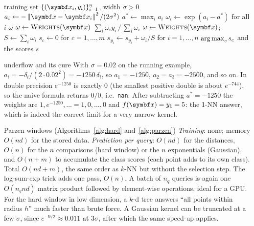 \documentclass[11pt]{article}
\begin{document}
\begin{algorithm}[htbp]
\caption{Gaussian Parzen classifier and Nadaraya--Watson regressor (log-sum-exp form)}
\label{alg:parzen}
\begin{algorithmic}[1]
\Require training set $\{(\x_i, y_i)\}_{i=1}^n$, width $\sigma > 0$
    \State $a_i \gets -\norm{\x - \x_i}^2 / (2\sigma^2)$ 
  \EndFor
  \State $a^* \gets \max_i a_i$
  \State $\omega_i \gets \exp(a_i - a^*)$ for all $i$ 
  \State \Return $\omega$
\EndFunction
{}
  \State $\omega \gets \Call{Weights}{\x}$
  \State \Return $\sum_i \omega_i y_i \,/\, \sum_i \omega_i$
\EndFunction
{}
  \State $\omega \gets \Call{Weights}{\x}$; \ $S \gets \sum_i \omega_i$
  \State $s_c \gets 0$ for $c = 1, \dots, m$
  \State $s_{y_i} \gets s_{y_i} + \omega_i / S$ for $i = 1, \dots, n$ 
  \State \Return $\operatorname*{arg\,max}_c s_c$ and the scores $s$
\EndFunction
\end{algorithmic}
\end{algorithm}

\begin{worked}{underflow and its cure}
With $\sigma = 0.02$ on the running example, $a_i = -\delta_i / (2 \cdot 0.02^2) = -1250\, \delta_i$, so
$a_1 = -1250$, $a_2 = a_3 = -2500$, and so on. In double precision $e^{-1250}$ is exactly $0$ (the smallest positive
double is about $e^{-744}$), so the naive formula returns $0/0$, i.e.\ \texttt{nan}. After subtracting
$a^* = -1250$ the weights are $1, e^{-1250}, \dots = 1, 0, \dots, 0$ and $f(\x) = y_1 = 5$: the 1-NN answer, which is
indeed the correct limit for a very narrow kernel.
\end{worked}


\begin{runtime}{Parzen windows (Algorithms~\ref{alg:hard} and~\ref{alg:parzen})}
\emph{Training}: none; memory $O(nd)$ for the stored data. \emph{Prediction per query}: $O(nd)$ for the distances,
$O(n)$ for the $n$ comparisons (hard window) or the $n$ exponentials (Gaussian), and $O(n + m)$ to accumulate the
class scores (each point adds to its own class). Total $O(nd + m)$, the same order as $k$-NN but without the
selection step. The log-sum-exp trick adds one pass, $O(n)$. A batch of $n_q$ queries is again one $O(n_q nd)$ matrix
product followed by element-wise operations, ideal for a GPU. For the hard window in low dimension, a $k$-d tree
answers ``all points within radius $h$'' much faster than brute force. A Gaussian kernel can be truncated at a few
$\sigma$, since $e^{-9/2} \approx 0.011$ at $3\sigma$, after which the same speed-up applies.
\end{runtime}
\end{document}

